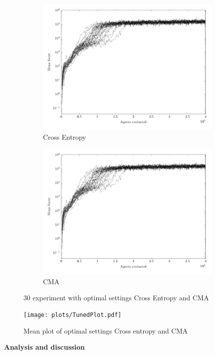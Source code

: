 \begin{figure}[H]
	\centering
	\captionsetup[subfigure]{justification=centering}
    \begin{subfigure}[b]{0.49\textwidth}
    	\caption{Cross Entropy}
        \includegraphics[width=\textwidth]{data/TunedComparison/CE_Optimal_Bertsekas_NormalTetris/PlotFile.pdf}
    \end{subfigure} 
    \begin{subfigure}[b]{0.49\textwidth}
    	\caption{CMA}
        \includegraphics[width=\textwidth]{data/TunedComparison/CE_Optimal_Bertsekas_NormalTetris/PlotFile.pdf}
    \end{subfigure}

    \caption{30 experiment with optimal settings Cross Entropy and CMA}
\end{figure}

\begin{figure}[H]
\centering
\texttt{[image: plots/TunedPlot.pdf]}
\caption{Mean plot of optimal settings Cross entropy and CMA}
\end{figure}


\textbf{Analysis and discussion}\\

